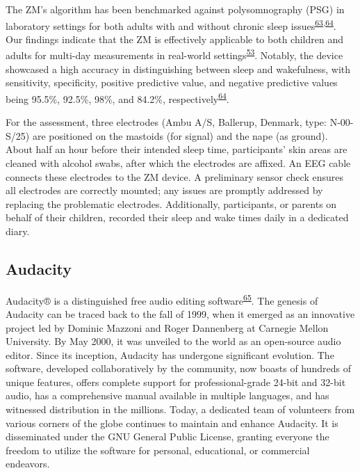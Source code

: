 \documentclass[
  9pt,
]{scrbook}
\begin{document}
The ZM's algorithm has been benchmarked against polysomnography (PSG) in
laboratory settings for both adults with and without chronic sleep
issues\textsuperscript{\protect\hyperlink{ref-wang_evaluation_2015}{63},\protect\hyperlink{ref-kaplan_performance_2014}{64}}.
Our findings indicate that the ZM is effectively applicable to both
children and adults for multi-day measurements in real-world
settings\textsuperscript{\protect\hyperlink{ref-hees_novel_2015}{53}}.
Notably, the device showcased a high accuracy in distinguishing between
sleep and wakefulness, with sensitivity, specificity, positive
predictive value, and negative predictive values being 95.5\%, 92.5\%,
98\%, and 84.2\%,
respectively\textsuperscript{\protect\hyperlink{ref-kaplan_performance_2014}{64}}.

For the assessment, three electrodes (Ambu A/S, Ballerup, Denmark, type:
N-00-S/25) are positioned on the mastoids (for signal) and the nape (as
ground). About half an hour before their intended sleep time,
participants' skin areas are cleaned with alcohol swabs, after which the
electrodes are affixed. An EEG cable connects these electrodes to the ZM
device. A preliminary sensor check ensures all electrodes are correctly
mounted; any issues are promptly addressed by replacing the problematic
electrodes. Additionally, participants, or parents on behalf of their
children, recorded their sleep and wake times daily in a dedicated
diary.

\hypertarget{audacity}{%
\subsection{Audacity}\label{audacity}}

Audacity®️ is a distinguished free audio editing
software\textsuperscript{\protect\hyperlink{ref-audacity}{65}}. The
genesis of Audacity can be traced back to the fall of 1999, when it
emerged as an innovative project led by Dominic Mazzoni and Roger
Dannenberg at Carnegie Mellon University. By May 2000, it was unveiled
to the world as an open-source audio editor. Since its inception,
Audacity has undergone significant evolution. The software, developed
collaboratively by the community, now boasts of hundreds of unique
features, offers complete support for professional-grade 24-bit and
32-bit audio, has a comprehensive manual available in multiple
languages, and has witnessed distribution in the millions. Today, a
dedicated team of volunteers from various corners of the globe continues
to maintain and enhance Audacity. It is disseminated under the GNU
General Public License, granting everyone the freedom to utilize the
software for personal, educational, or commercial endeavors.
\end{document}
